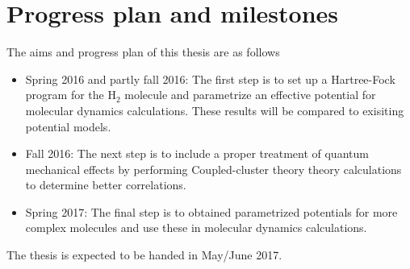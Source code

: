 \documentclass[10pt]{article}
\begin{document}
\section*{Progress plan and milestones}
The aims and progress plan of this thesis are as follows
\begin{itemize}
\item Spring 2016 and partly fall 2016:  The first step is to set up a Hartree-Fock program for the H$_2$ molecule and parametrize an effective potential for molecular dynamics calculations. These results will be compared to exisiting potential models.
\item Fall 2016:  The next step is to include a proper treatment of quantum mechanical effects by performing Coupled-cluster theory  theory calculations to determine better correlations.
\item Spring 2017: The final step is to obtained parametrized potentials for more complex molecules and use these
in molecular dynamics calculations.
\end{itemize}
 
The thesis is expected to be handed in May/June 2017.
\end{document}
